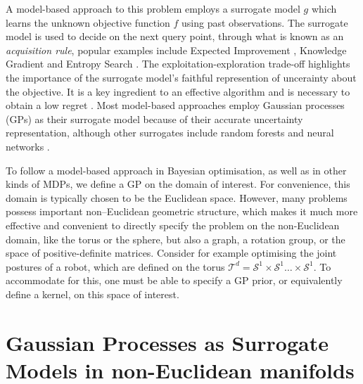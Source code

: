 A model-based approach to this problem employs a surrogate model $g$ which learns the unknown objective function $f$ using past observations. The surrogate model is used to decide on the next query point, through what is known as an \emph{acquisition rule},
popular examples include Expected Improvement \citep{jones1998efficient}, Knowledge Gradient \citep{frazier2009knowledge} and Entropy Search \citep{hennig2012entropy}. The exploitation-exploration trade-off highlights the importance of the surrogate model's faithful represention of uncerainty about the objective. It is a key ingredient to an effective algorithm and is necessary to obtain a low regret \citep{srinivas2009gaussian}. Most model-based approaches employ Gaussian processes (GPs) as their surrogate model because of their accurate uncertainty representation, although other surrogates include random forests \citep{hutter2014efficient} and neural networks \citep{snoek2015scalable}.

To follow a model-based approach in Bayesian optimisation, as well as in other kinds of MDPs, we define a GP on the domain of interest. For convenience, this domain is typically chosen to be the Euclidean space. However, many problems possess important non–Euclidean geometric structure, which makes it much more effective and convenient to directly specify the problem on the non-Euclidean domain, like the torus or the sphere, but also a graph, a rotation group, or the space of positive-definite matrices. Consider for example optimising the joint postures of a robot, which are defined on the torus $\mathcal{T}^d = \mathcal{S}^1 \times \mathcal{S}^1 \ldots \times \mathcal{S}^1$. To accommodate for this, one must be able to specify a GP prior, or equivalently define a kernel, on this space of interest.

\section{Gaussian Processes as Surrogate Models in non-Euclidean manifolds}
\label{sec:gp-noneuclidean}

